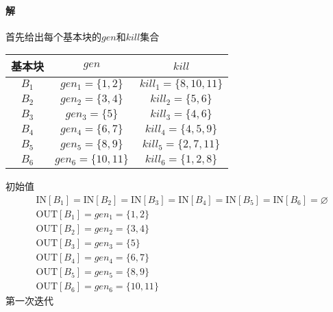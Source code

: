 \documentclass{article}
\begin{document}
\paragraph{解}
首先给出每个基本块的$gen$和$kill$集合
\begin{table}[H]
    \centering
    \begin{tabular}{|c|c|c|}
    \hline
    基本块 & $gen$ & $kill$ \\ \hline
    $B_1$ & $gen_1 = \{1,2\}$ & $kill_1 = \{8,10,11\}$ \\ \hline
    $B_2$ & $gen_2 = \{3,4\}$ & $kill_2 = \{5,6\}$ \\ \hline
    $B_3$ & $gen_3 = \{5\}$ & $kill_3 = \{4,6\}$ \\ \hline
    $B_4$ & $gen_4 = \{6,7\}$ & $kill_4 = \{4,5,9\}$ \\ \hline
    $B_5$ & $gen_5 = \{8,9\}$ & $kill_5 = \{2,7,11\}$ \\ \hline
    $B_6$ & $gen_6 = \{10,11\}$ & $kill_6 = \{1,2,8\}$ \\ \hline
    \end{tabular}
\end{table}
初始值
\begin{align*}
   & \text{IN}[B_1] = \text{IN}[B_2] = \text{IN}[B_3] = \text{IN}[B_4] = \text{IN}[B_5] = \text{IN}[B_6] = \varnothing \\
   & \text{OUT}[B_1] = gen_1 = \{1,2\} \\
   & \text{OUT}[B_2] = gen_2 = \{3,4\} \\
   & \text{OUT}[B_3] = gen_3 = \{5\} \\
   & \text{OUT}[B_4] = gen_4 = \{6,7\} \\
   & \text{OUT}[B_5] = gen_5 = \{8,9\} \\
   & \text{OUT}[B_6] = gen_6 = \{10,11\}
\end{align*}
第一次迭代
\end{document}
